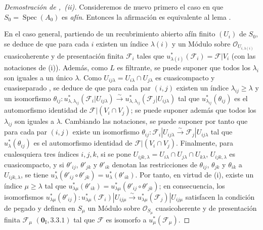 \begin{proof}[Demostración de ,~(ii)]
Consideremos de nuevo primero el caso en que $S_0=\operatorname{Spec}(A_0)$ es \emph{afín}.
Entonces la afirmación es equivalente al lema .

En el caso general, partiendo de un recubrimiento abierto afín finito $(U_i)$ de $S_0$, se deduce de  que para cada $i$ existen un índice $\lambda(i)$ y un Módulo sobre $\mathcal O_{U_{i,\lambda(i)}}$ cuasicoherente y de presentación finita $\mathcal F_i$ tales que $u_{\lambda(i)}^*(\mathcal F_i)=\mathcal F|V_i$ (con las notaciones de (i)).
Además, como $L$ es filtrante, se puede suponer que todos los $\lambda_i$ son iguales a un único $\lambda$.
Como $U_{ij\lambda}=U_{i\lambda}\cap U_{j\lambda}$ es cuasicompacto y cuasiseparado , se deduce de  que para cada par $(i,j)$ existen un índice $\lambda_{ij}\geq\lambda$ y un isomorfismo
$\theta_{ij}:u_{\lambda,\lambda_{ij}}^*(\mathcal F_i|U_{ij\lambda})
  \xrightarrow{\sim}
  u_{\lambda,\lambda_{ij}}^*(\mathcal F_j|U_{ij\lambda})$
tal que $u_{\lambda_{ij}}^*(\theta_{ij})$ es el automorfismo identidad de $\mathcal F|(V_i\cap V_j)$; se puede suponer además que todos los $\lambda_{ij}$ son iguales a $\lambda$.
Cambiando las notaciones, se puede suponer por tanto que para cada par $(i,j)$ existe un isomorfismo $\theta_{ij}:\mathcal F_i|U_{ij\lambda}
  \xrightarrow{\sim}\mathcal F_j|U_{ij\lambda}$ tal que $u_\lambda^*(\theta_{ij})$ es el automorfismo identidad de $\mathcal F|(V_i\cap V_j)$. Finalmente, para cualesquiera tres índices $i,j,k$, si se pone $U_{ijk,\lambda}=U_{i\lambda}\cap U_{j\lambda}\cap U_{k\lambda}$, $U_{ijk,\lambda}$ es cuasicompacto, y si $\theta'_{ij}$, $\theta'_{jk}$ y $\theta'_{ik}$ denotan las restricciones de $\theta_{ij}$, $\theta_{jk}$ y $\theta_{ik}$ a $U_{ijk,\lambda}$, se tiene $u_\lambda^*(\theta'_{ij}\circ\theta'_{jk})=u_\lambda^*(\theta'_{ik})$.
Por tanto, en virtud de (i), existe un índice $\mu\geq\lambda$ tal que $u_{\lambda\mu}^*(\theta'_{ik})
  =u_{\lambda\mu}^*(\theta'_{ij}\circ\theta'_{jk})$; en consecuencia, los isomorfismos $u_{\lambda\mu}^*(\theta'_{ij}):
  u_{\lambda\mu}^*(\mathcal F_i)|U_{ij\mu}
  \xrightarrow{\sim}
  u_{\lambda\mu}^*(\mathcal F_j)|U_{ij\mu}$ satisfacen la condición de pegado y definen en $S_\mu$ un Módulo sobre $\mathcal O_{S_\mu}$ cuasicoherente y de presentación finita $\mathcal F_\mu$ $(\mathbf{0}_{\mathrm I},3.3.1)$ tal que $\mathcal F$ es isomorfo a $u_\mu^*(\mathcal F_\mu)$.
\end{proof}

